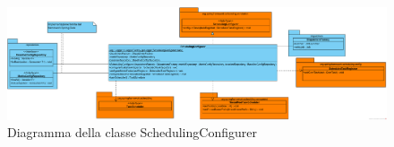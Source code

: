 

		\begin{figure}[htbp]
           	\centering
       	    \includegraphics[width=\textwidth]{./img/DiagrammiClasse/SchedulingConfigurer.png}
   	        \caption[Diagramma della classe SchedulingConfigurer]{Diagramma della classe SchedulingConfigurer}
	    \end{figure}\\
        

